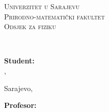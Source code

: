 \begin{titlepage}
	\begin{figure}[t]
		\centering
		\begin{minipage}{.6\textwidth}
			\centering
			\begin{spacing}{1.25}
				\textsc{\large Univerzitet u Sarajevu}\\
				\textsc{\large Prirodno-matematički fakultet}\\
				\textsc{\large Odsjek za fiziku}\\
			\end{spacing}
		\end{minipage}
	\end{figure}
	\vspace*{\fill}
	\begin{center}
		\begin{spacing}{1.5}
			{\bfseries \Large \MakeUppercase\@naslov}\\
		\end{spacing}
		\vspace{2mm}
		\begin{spacing}{1}
			\large \MakeUppercase\@podnaslov
		\end{spacing}
	\end{center}
	\vspace*{\fill}
	\begin{figure}[b]
		\centering
		\begin{minipage}{.325\textwidth}
			\textbf{Student:}\\
			\@student, \@indeks \\
		\end{minipage}
		\begin{minipage}{.30\textwidth}
			\begin{center}
				\vspace{25mm}
				Sarajevo, \@datum
			\end{center}
		\end{minipage}
		\begin{minipage}{.325\textwidth}
			\textbf{Profesor: }\\
			\@profesor \\
		\end{minipage}
	\end{figure}
\end{titlepage}